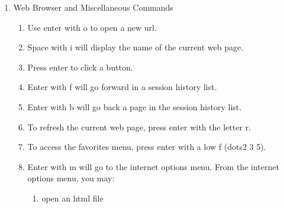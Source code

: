 \documentclass[10pt,letterpaper,twoside]{report}
\begin{document}
{{{\begin{enumerate}
\begin{enumerate}
		      \item To cycle through the four Braille display modes, press previous and next repeatedly.
		      \item The advance thumb-key with the next thumb-key repeatedly will cycle through the text file display options.
		      \item On the Pulse Data page, go to the top of the page by using space with dots1 2 3.
		      \item Now type a g for the Google search engine link.  Then press enter and you will go to the Google url.
		      \item Conduct a search for a specific topic of interest on the Google page. To get to the text input control, press space with dots4 and 6.  Use computer Braille to key in the name of a topic.  Press space with dots4 and 6 to move to the next input control, which should be the search button.
		      \item Press enter to begin the search.  You may also just press enter after you write in the search edit box.
		      \item Use space to move forward by link.  Move back by link by pressing backspace.  Explore the results of your search.  Press enter on a link to open the url. Use the web browser and miscellaneous commands listed here. Practice as necessary.
	      \end{enumerate}
	\item Web Browser and Miscellaneous Commands
	      \begin{enumerate}
		      \item Use enter with o to open a new url.
		      \item Space with i will display the name of the current web page.
		      \item Press enter to click a button.
		      \item Enter with f will go forward in a session history list.
		      \item Enter with b will go back a page in the session history list.
		      \item To refresh the current web page, press enter with the letter r.
		      \item To access the favorites menu, press enter with a low f (dots2 3 5).
		      \item Enter with m will go to the internet options menu.  From the internet options menu, you may:
		            \begin{enumerate}
			            \item open an html file

\end{enumerate}
\end{enumerate}
\end{enumerate}}}}
\end{document}
